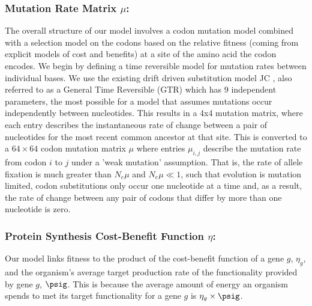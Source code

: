 \documentclass{article}
\newcommand{\Nemu}{\ensuremath{{N_e \mu}}\xspace} %
\newcommand{\etag}{\ensuremath{\eta_g}\xspace}
\newcommand{\muij}{\ensuremath{\mu_{i,j}}\xspace}
\begin{document}
\subsubsection*{Mutation Rate Matrix $\mu$: }
The overall structure of our model involves a codon mutation model combined with a selection model on the codons based on the relative fitness (coming from explicit models of cost and benefits) at a site of the amino acid the codon encodes.
We begin by defining a time reversible model for mutation rates between individual bases.
We use the existing drift driven substitution model JC \citet{JukesAndCantor1969}, also referred to as a General Time Reversible (GTR) \citet{Tavare1986,Yang2014} which has 9 independent parameters, the most possible for a model that assumes mutations occur independently between nucleotides.
This results in a 4x4 mutation matrix, where each entry describes the instantaneous rate of change between a pair of nucleotides for the most recent common ancestor at that site.
This is converted to a $64 \times 64$ codon mutation matrix $\mu$ where entries $\muij$ describe the mutation rate from codon $i$ to $j$ under a 'weak mutation' assumption.
That is, the rate of allele fixation is much greater than \Nemu and $\Nemu \ll 1$, such that evolution is mutation limited, codon substitutions only occur one nucleotide at a time and, as a result,  the rate of change between any pair of codons that differ by more than one nucleotide is zero.

\subsubsection*{Protein Synthesis Cost-Benefit Function $\eta$: }
Our model links fitness to the product of the cost-benefit function of a gene $g$, $\etag$, and the organism's average target production rate of the functionality provided by gene $g$, $\psig$.
This is because the average amount of energy an organism spends to met its target functionality for a gene $g$ is $\etag \times \psig$.
 
\end{document}
